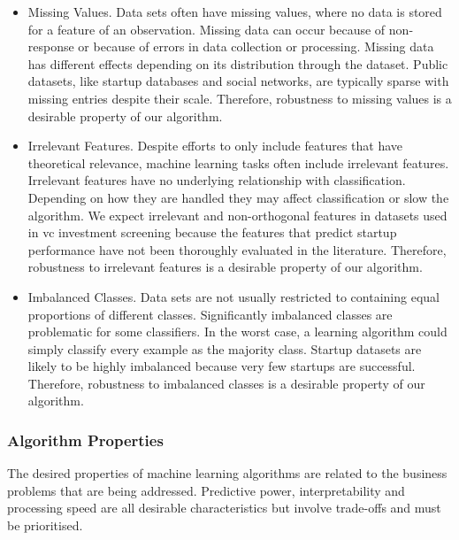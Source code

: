 \documentclass[../thesis/thesis.tex]{subfiles}
\begin{document}
\begin{itemize}

\item Missing Values. Data sets often have missing values, where no data is stored for a feature of an observation. Missing data can occur because of non-response or because of errors in data collection or processing. Missing data has different effects depending on its distribution through the dataset. Public datasets, like startup databases and social networks, are typically sparse with missing entries despite their scale. Therefore, robustness to missing values is a desirable property of our algorithm.

\item Irrelevant Features. Despite efforts to only include features that have theoretical relevance, machine learning tasks often include irrelevant features. Irrelevant features have no underlying relationship with classification. Depending on how they are handled they may affect classification or slow the algorithm. We expect irrelevant and non-orthogonal features in datasets used in \gls{vc} investment screening because the features that predict startup performance have not been thoroughly evaluated in the literature. Therefore, robustness to irrelevant features is a desirable property of our algorithm.

\item Imbalanced Classes. Data sets are not usually restricted to containing equal proportions of different classes. Significantly imbalanced classes are problematic for some classifiers. In the worst case, a learning algorithm could simply classify every example as the majority class. Startup datasets are likely to be highly imbalanced because very few startups are successful. Therefore, robustness to imbalanced classes is a desirable property of our algorithm.

\end{itemize}

\subsubsection{Algorithm Properties}

The desired properties of machine learning algorithms are related to the business problems that are being addressed. Predictive power, interpretability and processing speed are all desirable characteristics but involve trade-offs and must be prioritised.
\end{document}
